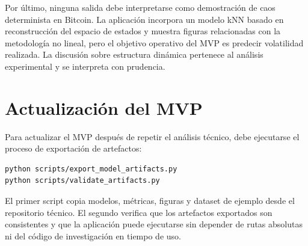 Por último, ninguna salida debe interpretarse como demostración de caos determinista en Bitcoin. La aplicación incorpora un modelo kNN basado en reconstrucción del espacio de estados y muestra figuras relacionadas con la metodología no lineal, pero el objetivo operativo del MVP es predecir volatilidad realizada. La discusión sobre estructura dinámica pertenece al análisis experimental y se interpreta con prudencia.

\section{Actualización del MVP}\label{sec:actualizacion-mvp}

Para actualizar el MVP después de repetir el análisis técnico, debe ejecutarse el proceso de exportación de artefactos:

\begin{verbatim}
python scripts/export_model_artifacts.py
python scripts/validate_artifacts.py
\end{verbatim}

El primer script copia modelos, métricas, figuras y dataset de ejemplo desde el repositorio técnico. El segundo verifica que los artefactos exportados son consistentes y que la aplicación puede ejecutarse sin depender de rutas absolutas ni del código de investigación en tiempo de uso.